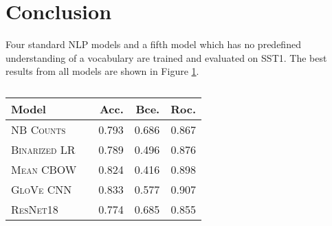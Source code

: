 \documentclass[11pt]{article}
\begin{document}
%
%
%
%
%


\section{Conclusion}

Four standard NLP models and a fifth model which has no predefined understanding of a vocabulary are trained and evaluated on SST1. The best results from all models are shown in Figure \ref{tab:conc}.

\begin{table}[h]
\centering
\begin{tabular}{llrrr}
 \toprule
 Model &  & Acc. & Bce. & Roc.\\
 \midrule
 \textsc{NB Counts} & & 0.793  & 0.686 & 0.867\\
 \textsc{Binarized LR} & & 0.789 & 0.496 & 0.876\\
 \textsc{Mean CBOW} & & 0.824 & 0.416 & 0.898\\
 \textsc{GloVe CNN} & & 0.833  & 0.577 & 0.907\\
 \midrule
 \textsc{ResNet18} & & 0.774 & 0.685 & 0.855\\
 \bottomrule
\end{tabular}
\caption{\label{tab:conc} }
\end{table}



\end{document}
